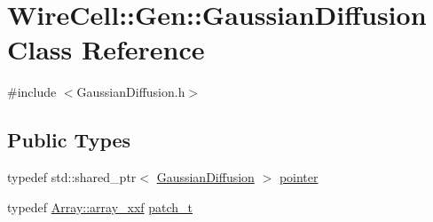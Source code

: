 \hypertarget{class_wire_cell_1_1_gen_1_1_gaussian_diffusion}{}\section{Wire\+Cell\+:\+:Gen\+:\+:Gaussian\+Diffusion Class Reference}
\label{class_wire_cell_1_1_gen_1_1_gaussian_diffusion}


{\ttfamily \#include $<$Gaussian\+Diffusion.\+h$>$}

\subsection*{Public Types}
\begin{DoxyCompactItemize}
\item 
typedef std\+::shared\+\_\+ptr$<$ \hyperlink{class_wire_cell_1_1_gen_1_1_gaussian_diffusion}{Gaussian\+Diffusion} $>$ \hyperlink{class_wire_cell_1_1_gen_1_1_gaussian_diffusion_ac7fce7070c18877fa61abc26ad410ce9}{pointer}
\item 
typedef \hyperlink{namespace_wire_cell_1_1_array_ab565fef5e33632bb02f0ed4be803020c}{Array\+::array\+\_\+xxf} \hyperlink{class_wire_cell_1_1_gen_1_1_gaussian_diffusion_a33cd8c39349ac40f3757405be6d8f7b0}{patch\+\_\+t}
\end{DoxyCompactItemize}
